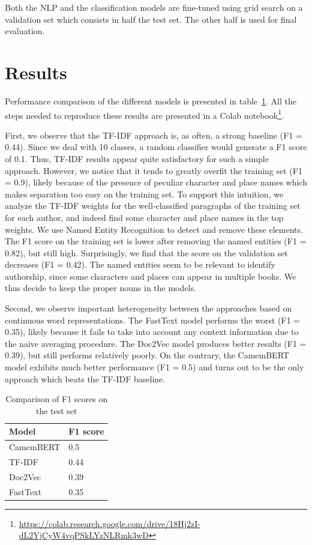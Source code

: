\documentclass[11pt,a4paper]{article}
\begin{document}
Both the NLP and the classification models are fine-tuned using grid search on a validation set which consists in half the test set. The other half is used for final evaluation.

\section{Results}

Performance comparison of the different models is presented in table~\ref{compar}. All the steps needed to reproduce these results are presented in a Colab notebook\footnote{\url{https://colab.research.google.com/drive/18Hj2zI-dL2YjCyW4vqPSkLYzNLRmk3wD}}. 

First, we observe that the TF-IDF approach is, as often, a strong baseline (F1 = 0.44). Since we deal with 10 classes, a random classifier would generate a F1 score of 0.1. Thus, TF-IDF results appear quite satisfactory for such a simple approach.  However, we notice that it tends to greatly overfit the training set (F1 = 0.9), likely because of the presence of peculiar character and place names which makes separation too easy on the training set. To support this intuition, we analyze the TF-IDF weights for the well-classified paragraphs of the training set for each author, and indeed find some character and place names in the top weights. We use Named Entity Recognition to detect and remove these elements. The F1 score on the training set is lower after removing the named entities (F1 = 0.82), but still high. Surprisingly, we find that the score on the validation set decreases (F1 = 0.42). The named entities seem to be relevant to identify authorship, since some characters and places can appear in multiple books. We thus decide to keep the proper nouns in the models.

Second, we observe important heterogeneity between the approaches based on continuous word representations. The FastText model performs the worst (F1 = 0.35), likely because it fails to take into account any context information due to the naive averaging procedure. The Doc2Vec model produces better results (F1 = 0.39), but still performs relatively poorly. On the contrary, the CamemBERT model exhibits much better performance (F1 = 0.5) and turns out to be the only approach which beats the TF-IDF baseline.



\begin{table}[]
\caption{Comparison of F1 scores on the test set}
\label{compar}
\begin{center}
\begin{tabular}{|l|l|}
\hline
\textbf{Model} & \textbf{F1 score} \\ \hline
CamemBERT       & 0.5                  \\ \hline
TF-IDF         & 0.44              \\ \hline
Doc2Vec        & 0.39                  \\ \hline
FastText      & 0.35                  \\ \hline
\end{tabular}
\end{center}
\end{table}
\end{document}
